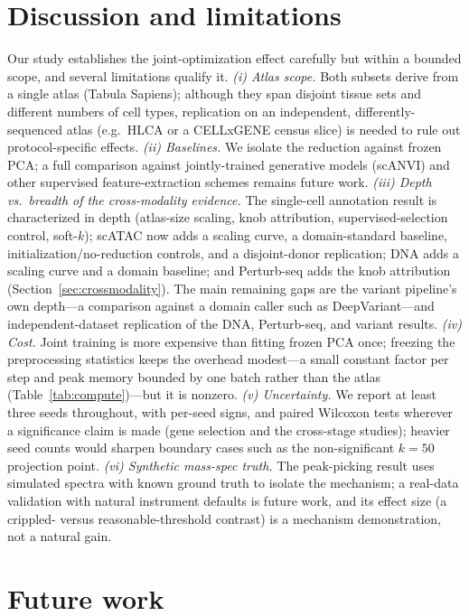 \documentclass[10pt,twocolumn]{article}
\begin{document}
\section{Discussion and limitations}
\label{sec:limitations}

Our study establishes the joint-optimization effect carefully but within a bounded scope,
and several limitations qualify it. \emph{(i) Atlas scope.} Both subsets derive from a
single atlas (Tabula Sapiens); although they span disjoint tissue sets and different
numbers of cell types, replication on an independent, differently-sequenced atlas (e.g.\
HLCA or a CELLxGENE census slice) is needed to rule out protocol-specific effects.
\emph{(ii) Baselines.} We isolate the reduction against frozen PCA; a full comparison
against jointly-trained generative models (scANVI) and other supervised feature-extraction
schemes remains future work. \emph{(iii) Depth vs.\ breadth of the cross-modality evidence.} The single-cell annotation
result is characterized in depth (atlas-size scaling, knob attribution, supervised-selection
control, soft-$k$); scATAC now adds a scaling curve, a domain-standard baseline,
initialization/no-reduction controls, and a disjoint-donor replication; DNA adds a scaling
curve and a domain baseline; and Perturb-seq adds the knob attribution
(Section~\ref{sec:crossmodality}). The main remaining gaps are the variant pipeline's own
depth---a comparison against a domain caller such as DeepVariant---and independent-dataset
replication of the DNA, Perturb-seq, and variant results.
\emph{(iv) Cost.} Joint training is more expensive than fitting frozen PCA once; freezing
the preprocessing statistics keeps the overhead modest---a small constant factor per step and
peak memory bounded by one batch rather than the atlas (Table~\ref{tab:compute})---but it is
nonzero. \emph{(v) Uncertainty.} We report at least three seeds throughout,
with per-seed signs, and paired Wilcoxon tests wherever a significance claim is made (gene
selection and the cross-stage studies); heavier seed counts would sharpen boundary cases such
as the non-significant $k{=}50$ projection point. \emph{(vi) Synthetic mass-spec truth.} The
peak-picking result uses simulated spectra with known ground truth to isolate the mechanism;
a real-data validation with natural instrument defaults is future work, and its effect size
(a crippled- versus reasonable-threshold contrast) is a mechanism demonstration, not a natural
gain.

\section{Future work}
\label{sec:future}
\end{document}
